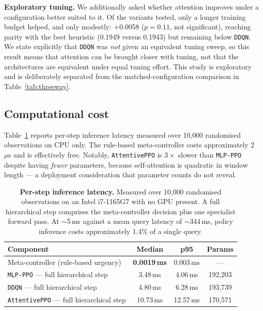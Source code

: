 \documentclass[fleqn,10pt]{wlscirep}
\newcommand{\attentive}{\texttt{AttentivePPO}}
\newcommand{\mlpppo}{\texttt{MLP-PPO}}
\newcommand{\ddqn}{\texttt{DDQN}}
\begin{document}
\textbf{Exploratory tuning.}
We additionally asked whether attention improves under a configuration
better suited to it. Of the variants tested, only a longer training
budget helped, and only modestly: $+$0.0058 ($p = 0.11$, not
significant), reaching parity with the best heuristic (0.1949 versus
0.1943) but remaining below \ddqn{}. We state explicitly that \ddqn{}
was \emph{not} given an equivalent tuning sweep, so this result means
that attention can be brought closer with tuning, not that the
architectures are equivalent under equal tuning effort. This study is
exploratory and is deliberately separated from the matched-configuration
comparison in Table~\ref{tab:threeway}.

\FloatBarrier

\subsection*{Computational cost}
\label{sec:cost}

Table~\ref{tab:inference} reports per-step inference latency measured
over 10{,}000 randomised observations on CPU only. The rule-based
meta-controller costs approximately 2\,$\mu$s and is effectively free.
Notably, \attentive{} is $3\times$ slower than \mlpppo{} despite having
\emph{fewer} parameters, because self-attention is quadratic in window
length --- a deployment consideration that parameter counts do not
reveal.

\begin{table}[!htbp]
\centering
\begin{tabular}{lccc}
\toprule
\textbf{Component} & \textbf{Median} & \textbf{p95} & \textbf{Params} \\
\midrule
Meta-controller (rule-based urgency) & \textbf{0.0019\,ms} & 0.003\,ms & --- \\
\mlpppo{} --- full hierarchical step   & 3.48\,ms  & 4.06\,ms  & 192{,}203 \\
\ddqn{} --- full hierarchical step     & 4.80\,ms  & 6.28\,ms  & 193{,}739 \\
\attentive{} --- full hierarchical step & 10.73\,ms & 12.57\,ms & 170{,}571 \\
\bottomrule
\end{tabular}
\caption{\label{tab:inference}\textbf{Per-step inference latency.}
  Measured over 10{,}000 randomised observations on an Intel i7-1165G7
  with no GPU present. A full hierarchical step comprises the
  meta-controller decision plus one specialist forward pass. At
  $\sim$5\,ms against a mean query latency of $\sim$344\,ms, policy
  inference costs approximately 1.4\% of a single query.}
\end{table}
\end{document}
